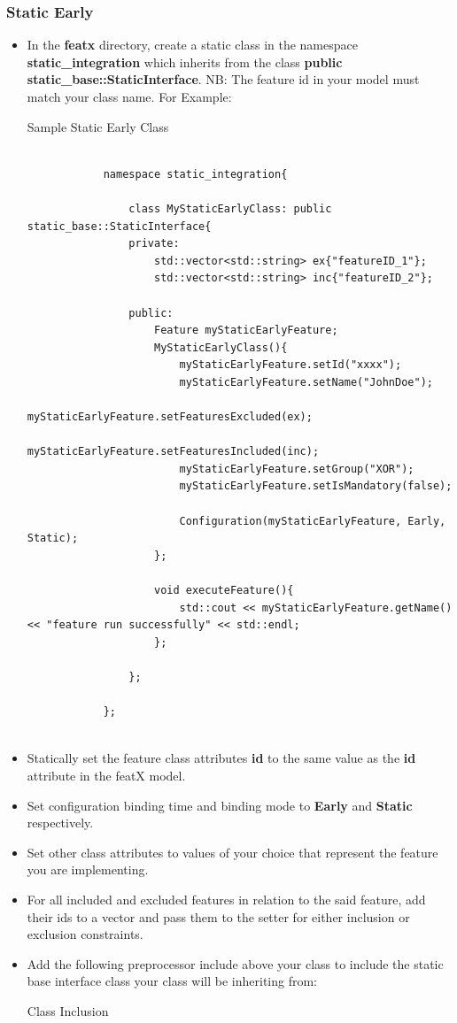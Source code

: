 \documentclass{article}
\newenvironment{longlisting}{\captionsetup{type=listing}}{}
\begin{document}
\subsubsection{Static Early}
\begin{itemize}
	\item In the \textbf{featx} directory, create a static class in the namespace \textbf{static\_integration} which inherits from the class \textbf{public static\_base::StaticInterface}. NB: The feature id in your model must match your class name. For Example:
	
	\begin{longlisting}
		\caption{Sample Static Early Class}
		\begin{verbatim}
			
			namespace static_integration{
				
				class MyStaticEarlyClass: public static_base::StaticInterface{
				private:
					std::vector<std::string> ex{"featureID_1"};
					std::vector<std::string> inc{"featureID_2"};
					
				public:
					Feature myStaticEarlyFeature;
					MyStaticEarlyClass(){
						myStaticEarlyFeature.setId("xxxx");
						myStaticEarlyFeature.setName("JohnDoe");
						myStaticEarlyFeature.setFeaturesExcluded(ex);
						myStaticEarlyFeature.setFeaturesIncluded(inc);
						myStaticEarlyFeature.setGroup("XOR");
						myStaticEarlyFeature.setIsMandatory(false);
						
						Configuration(myStaticEarlyFeature, Early, Static);
					};
					
					void executeFeature(){
						std::cout << myStaticEarlyFeature.getName() << "feature run successfully" << std::endl;
					};
					
				};
				
			};
			
		\end{verbatim}
		\label{samplestaticearly}
	\end{longlisting}
	\item Statically set the feature class attributes \textbf{id} to the same value as the \textbf{id} attribute in the featX model.
	\item Set configuration binding time and binding mode to \textbf{Early} and \textbf{Static} respectively.
	\item Set other class attributes to values of your choice that represent the feature you are implementing.
	\item For all included and excluded features in relation to the said feature, add their ids to a vector and pass them to the setter for either inclusion or exclusion constraints.
	\item Add the following preprocessor include above your class to include the static base interface class your class will be inheriting from:
	\begin{longlisting}
		\caption{Class Inclusion}
		\begin{verbatim}
			

\end{verbatim}
\end{longlisting}
\end{itemize}
\end{document}
